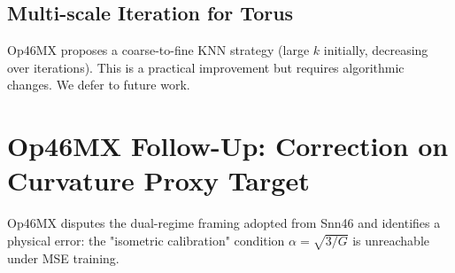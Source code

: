 \documentclass{article}
\begin{document}
\subsection{Multi-scale Iteration for Torus}

\begin{partial}
Op46MX proposes a coarse-to-fine KNN strategy (large $k$ initially, decreasing
over iterations). This is a practical improvement but requires algorithmic
changes. We defer to future work.
\end{partial}

\section{Op46MX Follow-Up: Correction on Curvature Proxy Target}

Op46MX disputes the dual-regime framing adopted from Snn46 and identifies a
physical error: the "isometric calibration" condition $\alpha = \sqrt{3/G}$
is unreachable under MSE training.
\end{document}
